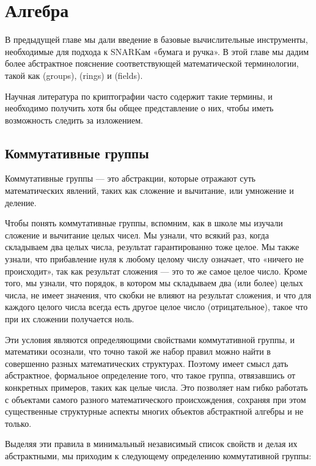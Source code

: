 \chapter{Алгебра}\label{chap:algebra}

В предыдущей главе мы дали введение в базовые вычислительные инструменты, необходимые для подхода к SNARKам «бумага и ручка». В этой главе мы дадим более абстрактное пояснение соответствующей математической терминологии, такой как  (groups),  (rings) и  (fields).

Научная литература по криптографии часто содержит такие термины, и необходимо получить хотя бы общее представление о них, чтобы иметь возможность следить за изложением.

\section{Коммутативные группы}
\label{sec:groups}
Коммутативные группы — это абстракции, которые отражают суть математических явлений, таких как сложение и вычитание, или умножение и деление.

Чтобы понять коммутативные группы, вспомним, как в школе мы изучали сложение и вычитание целых чисел. Мы узнали, что всякий раз, когда складываем два целых числа, результат гарантированно тоже целое. Мы также узнали, что прибавление нуля к любому целому числу означает, что «ничего не происходит», так как результат сложения — это то же самое целое число. Кроме того, мы узнали, что порядок, в котором мы складываем два (или более) целых числа, не имеет значения, что скобки не влияют на результат сложения, и что для каждого целого числа всегда есть другое целое число (отрицательное), такое что при их сложении получается ноль.

Эти условия являются определяющими свойствами коммутативной группы, и математики осознали, что точно такой же набор правил можно найти в совершенно разных математических структурах. Поэтому имеет смысл дать абстрактное, формальное определение того, что такое группа, отвязавшись от конкретных примеров, таких как целые числа. Это позволяет нам гибко работать с объектами самого разного математического происхождения, сохраняя при этом существенные структурные аспекты многих объектов абстрактной алгебры и не только.

Выделяя эти правила в минимальный независимый список свойств и делая их абстрактными, мы приходим к следующему определению коммутативной группы:


